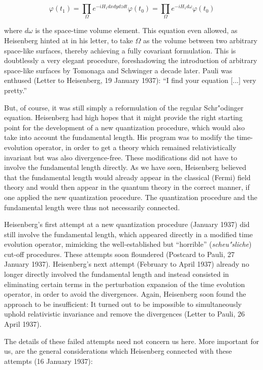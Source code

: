\documentclass[12pt]{article}
\begin{document}
\begin{equation}
\varphi(t_1) = \prod_{\Omega} e^{-i H_1 dx dy dz dt} \varphi(t_0) = \prod_{\Omega} e^{-i H_1 d\omega} \varphi(t_0)
\end{equation}

where $d\omega$ is the space-time volume element. This equation even allowed, as Heisenberg hinted at in his letter, to take $\Omega$ as the volume between two arbitrary space-like surfaces, thereby achieving a fully covariant formulation. This is doubtlessly a very elegant procedure, foreshadowing the introduction of arbitrary space-like surfaces by Tomonaga and Schwinger a decade later. Pauli was enthused (Letter to Heisenberg, 19 January 1937): ``I find your equation [...] very pretty.''

But, of course, it was still simply a reformulation of the regular Schr"odinger equation. Heisenberg had high hopes that it might provide the right starting point for the development of a new quantization procedure, which would also take into account the fundamental length. His program was to modify the time-evolution operator, in order to get a theory which remained relativistically invariant but was also divergence-free. These modifications did not have to involve the fundamental length directly. As we have seen, Heisenberg believed that the fundamental length would already appear in the classical (Fermi) field theory and would then appear in the quantum theory in the correct manner, if one applied the new quantization procedure.  The quantization procedure and the fundamental length were thus not necessarily connected.

Heisenberg's first attempt at a new quantization procedure (January 1937) did still involve the fundamental length, which appeared directly in a modified time evolution operator,  mimicking the well-established but ``horrible'' (\emph{scheu"sliche}) cut-off procedures. These attempts soon floundered (Postcard to Pauli, 27 January 1937). Heisenberg's next attempt (February to April 1937) already no longer directly involved the fundamental length and instead consisted in eliminating certain terms in the perturbation expansion of the time evolution operator, in order to avoid the divergences. Again, Heisenberg soon found the approach to be insufficient: It turned out to be impossible to simultaneously uphold relativistic invariance and remove the divergences (Letter to Pauli, 26 April 1937). 

The details of these failed attempts need not concern us here. More important for us, are the general considerations which Heisenberg connected with these attempts (16 January 1937):
\end{document}
